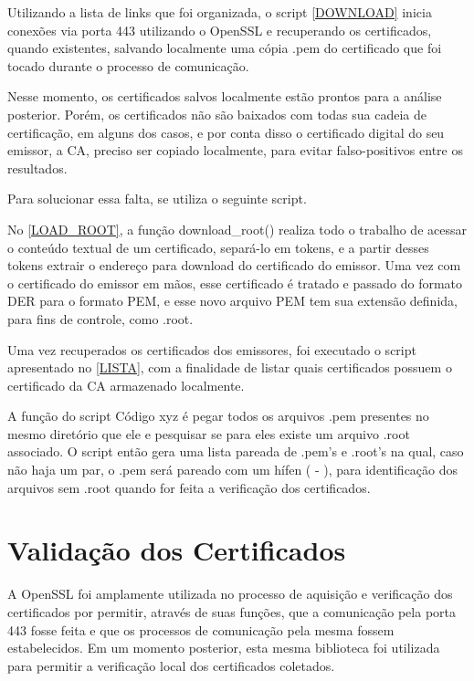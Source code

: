 		Utilizando a lista de links que foi organizada, o script \ref{DOWNLOAD} inicia conexões via porta 443 utilizando o OpenSSL e recuperando os certificados, quando existentes, salvando localmente uma cópia .pem do certificado que foi tocado durante o processo de comunicação.
		
		
		Nesse momento, os certificados salvos localmente estão prontos para a análise posterior. Porém, os certificados não são baixados com todas sua cadeia de certificação, em alguns dos casos, e por conta disso o certificado digital do seu emissor, a CA, preciso ser copiado localmente, para evitar falso-positivos entre os resultados.
		
		Para solucionar essa falta, se utiliza o seguinte script.
		
		
		No \ref{LOAD_ROOT}, a função download\_root() realiza todo o trabalho de acessar o conteúdo textual de um certificado, separá-lo em tokens, e  a partir desses tokens extrair o endereço para download do certificado do emissor. Uma vez com o certificado do emissor em mãos, esse certificado é tratado e passado do formato DER para o formato PEM, e esse novo arquivo PEM tem sua extensão definida, para fins de controle, como .root.
		
		Uma vez recuperados os certificados dos emissores, foi executado o script apresentado no \ref{LISTA}, com a finalidade de listar quais certificados possuem o certificado da CA armazenado localmente.

		
		A função do  script Código xyz é pegar todos os arquivos .pem presentes no mesmo diretório que ele e pesquisar se para eles existe um arquivo .root associado. O script então gera uma lista pareada de .pem's e .root's na qual, caso não haja um par, o .pem será pareado com um hífen ( - ), para identificação dos arquivos sem .root quando for feita a verificação dos certificados.

		\section[Validação dos Certificados]{Validação dos Certificados}

		A OpenSSL foi amplamente utilizada no processo de aquisição e verificação dos certificados por permitir, através de suas funções, que a comunicação pela porta 443  fosse feita e que os processos de comunicação pela mesma  fossem estabelecidos. Em um momento posterior, esta mesma biblioteca foi utilizada para permitir a verificação local dos certificados coletados.

